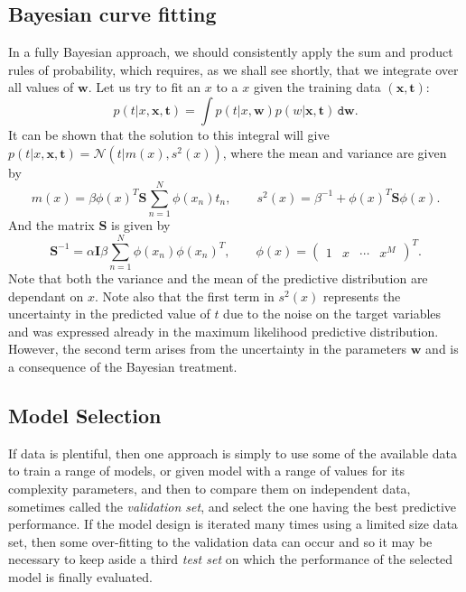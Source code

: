 \documentclass[11pt]{article}
\begin{document}
\subsection{Bayesian curve fitting}
In a fully Bayesian approach, we should consistently apply the sum and product
rules of probability, which requires, as we shall see shortly, that we
integrate over all values of $\textbf{w}$. Let us try to fit an $x$ to a $x$
given the training data $(\textbf{x}, \textbf{t})$:
\begin{equation*}
  p(t|x, \textbf{x}, \textbf{t}) = \int p(t|x, \textbf{w})
  p(w|\textbf{x}, \textbf{t}) \,\texttt{d}\textbf{w}.
\end{equation*}
It can be shown that the solution to this integral will give
$p(t|x, \textbf{x}, \textbf{t}) = \mathcal{N}(t|m(x), s^2(x))$, where the mean
and variance are given by
\begin{equation*}
  m(x) = \beta \phi(x)^T \textbf{S} \sum_{n=1}^N \phi(x_n)t_n, \qquad
  s^2(x) = \beta^{-1} + \phi(x)^T\textbf{S}\phi(x).
\end{equation*}
And the matrix $\textbf{S}$ is given by
\begin{equation*}
  \textbf{S}^{-1} = \alpha \textbf{I} \beta \sum_{n=1}^N \phi(x_n) \phi(x_n)^T,
  \qquad \phi(x) = \begin{pmatrix} 1 &x &\cdots &x^M\end{pmatrix}^T.
\end{equation*}
Note that both the variance and the mean of the predictive distribution are
dependant on $x$. Note also that the first term in $s^2(x)$ represents the
uncertainty in the predicted value of $t$ due to the noise on the target
variables and was expressed already in the maximum likelihood predictive
distribution. However, the second term arises from the uncertainty in the
parameters $\textbf{w}$ and is a consequence of the Bayesian treatment.
\subsection{Model Selection}
If data is plentiful, then one approach is simply to use some of the available
data to train a range of models, or given model with a range of values for its
complexity parameters, and then to compare them on independent data, sometimes
called the \textit{validation set}, and select the one having the best
predictive performance. If the model design is iterated many times using a
limited size data set, then some over-fitting to the validation data can occur
and so it may be necessary to keep aside a third \textit{test set} on which
the performance of the selected model is finally evaluated.
\end{document}
